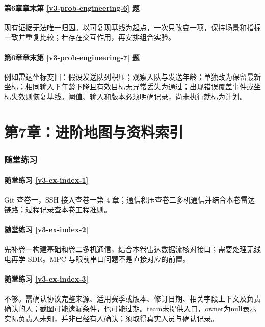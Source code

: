 \paragraph*{第6章章末第 \ref{v3-prob-engineering-6} 题}
\begin{solution}
现有证据无法唯一归因。以可复现基线为起点，一次只改变一项，保持场景和指标一致并重复比较；若存在交互作用，再安排组合实验。
\end{solution}

\paragraph*{第6章章末第 \ref{v3-prob-engineering-7} 题}
\begin{solution}
例如雷达坐标变旧：假设发送队列积压；观察入队与发送年龄；单独改为保留最新坐标；相同输入下年龄下降且有效目标无异常丢失为通过；出现错误覆盖事件或坐标失效则恢复基线。阈值、输入和版本必须明确记录，尚未执行就标为计划。
\end{solution}

\section*{第7章：进阶地图与资料索引}
{}
\subsubsection*{随堂练习}
\paragraph*{随堂练习 \ref{v3-ex-index-1}}
\begin{solution}
Git 查卷一，SSH 接入查卷一第 4 章；通信积压查卷二多机通信并结合本卷雷达链路；过程记录查本卷工程准则。
\end{solution}

\paragraph*{随堂练习 \ref{v3-ex-index-2}}
\begin{solution}
先补卷一构建基础和卷二多机通信，结合本卷雷达数据流核对接口；需要处理无线电再学 SDR。MPC 与眼前串口问题不是直接对应的前置。
\end{solution}

\paragraph*{随堂练习 \ref{v3-ex-index-3}}
\begin{solution}
不够。需确认协议完整来源、适用赛季或版本、修订日期、相关字段上下文及负责确认的人；截图可能遗漏条件，也可能过期。team未提供入口，owner为null表示实际负责人未知，并非已经有人确认；须取得真实人员与确认记录。
\end{solution}

